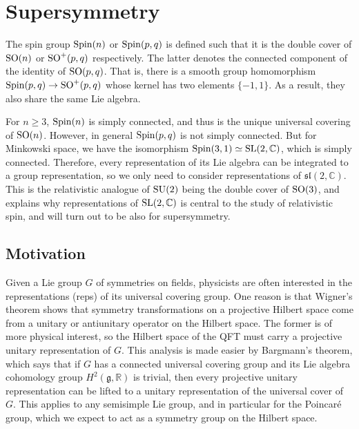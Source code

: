 \chapter{Supersymmetry} 
\label{appendix3}

The spin group $\operatorname{Spin}(n)$ or $\operatorname{Spin}(p,q)$ is defined such that it is the double cover of
$\operatorname{SO}(n)$ or $\operatorname{SO}^+(p,q)$ respectively. 
The latter denotes the connected component of the identity of $\operatorname{SO}(p,q)$. 
That is, there is a smooth group homomorphism $\operatorname{Spin}(p,q) \to \operatorname{SO}^+(p,q)$ whose kernel
has two elements $\{-1,1\}$. 
As a result, they also share the same Lie algebra.

For $n\geq 3$,
$\operatorname{Spin}(n)$ is simply connected, and thus is the unique universal covering 
of $\operatorname{SO}(n)$. However, in general $\operatorname{Spin}(p,q)$ is not simply connected. 
But for Minkowski space, we have the isomorphism $\operatorname{Spin}(3,1) \simeq
\operatorname{SL}(2,\mathbb{C})$, which is simply connected. 
Therefore, every representation of its Lie algebra can be integrated to a group
representation, so we only need to consider representations of
$\mathfrak{sl}(2,\mathbb{C})$.\cite[Theorem 5.6]{hall} 
This is the relativistic analogue of $\operatorname{SU}(2)$ being the double cover of  $\operatorname{SO}(3)$,
and explains why representations of $\operatorname{SL}(2,\mathbb{C})$ is central to the study
of relativistic spin, and will turn out to be also for supersymmetry. 


\section{Motivation}
Given a Lie group $G$ of symmetries on fields, physicists are often interested in the 
representations (reps) of its universal covering group. One reason is that
Wigner's theorem shows that symmetry transformations on a projective Hilbert space 
come from a unitary or antiunitary operator on the Hilbert space. The
former is of more physical interest, so the Hilbert
space of the QFT must carry a projective unitary representation of $G$. 
This analysis is made easier by
Bargmann's theorem, which says that if $G$ has a connected universal covering
group and its Lie algebra cohomology group
$H^2(\mathfrak{g},\mathbb{R})$ is trivial, then every projective unitary
representation can be lifted to a unitary representation of the universal cover
of $G$.\cite[Theorem 4.8]{cft} 
This applies to any semisimple Lie
group, and in particular for the Poincar\'e group, which we expect to act as a
symmetry group on the Hilbert space.  

